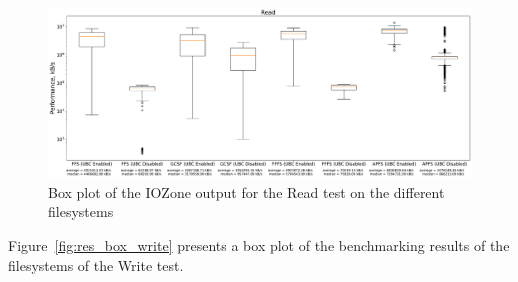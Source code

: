 
\begin{figure}[!ht]
	\label{fig:res_box_read}
	\begin{center}
		\includegraphics[width=1.0\textwidth]{figures.nosync/benchmarking/Read-boxplot.pdf}
	\end{center}
	\caption{Box plot of the IOZone output for the Read test on the different filesystems}
\end{figure}

\FloatBarrier

Figure~\ref{fig:res_box_write} presents a box plot of the benchmarking results of the filesystems of the Write test. 

